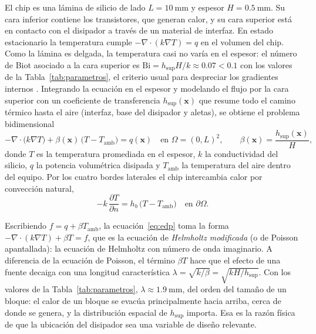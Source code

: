 \documentclass[preprint,11pt,sort&compress]{elsarticle}
\newcommand{\hs}{h_{\mathrm{sup}}}
\newcommand{\Tamb}{T_{\mathrm{amb}}}
\renewcommand{\vec}[1]{\bm{#1}}
\begin{document}
El chip es una lámina de silicio de lado $L=\SI{10}{\milli\metre}$ y espesor
$H=\SI{0.5}{\milli\metre}$. Su cara inferior contiene los transistores, que generan
calor, y su cara superior está en contacto con el disipador a través de un material de
interfaz. En estado estacionario la temperatura cumple
$-\nabla\cdot(k\nabla T)=q$ en el volumen del chip. Como la lámina es delgada, la
temperatura casi no varía en el espesor: el número de Biot asociado a la cara superior es
$\mathrm{Bi}=\hs H/k\approx\num{0.07}<\num{0.1}$ con los valores de la
Tabla~\ref{tab:parametros}, el criterio usual para despreciar los gradientes internos
\cite{incropera2007}. Integrando la ecuación en el espesor y modelando el flujo por la cara
superior con un coeficiente de transferencia $\hs(\vec x)$ que resume todo el camino
térmico hasta el aire (interfaz, base del disipador y aletas), se obtiene el problema
bidimensional
\begin{equation}
  -\nabla\cdot\bigl(k\nabla T\bigr) + \beta(\vec x)\,\bigl(T-\Tamb\bigr) = q(\vec x)
  \quad\text{en }\Omega=(0,L)^2,
  \qquad \beta(\vec x)=\frac{\hs(\vec x)}{H},
  \label{eq:edp}
\end{equation}
donde $T$ es la temperatura promediada en el espesor, $k$ la conductividad del silicio,
$q$ la potencia volumétrica disipada y $\Tamb$ la temperatura del aire dentro del equipo.
Por los cuatro bordes laterales el chip intercambia calor por convección natural,
\begin{equation}
  -k\,\frac{\partial T}{\partial n} = h_b\,\bigl(T-\Tamb\bigr)\quad\text{en }\partial\Omega .
  \label{eq:robin}
\end{equation}

Escribiendo $f=q+\beta\Tamb$, la ecuación~\eqref{eq:edp} toma la forma
$-\nabla\cdot(k\nabla T)+\beta T=f$, que es la ecuación de \emph{Helmholtz modificada}
(o de Poisson apantallada): la ecuación de Helmholtz con número de onda imaginario. A
diferencia de la ecuación de Poisson, el término $\beta T$ hace que el efecto de una fuente
decaiga con una longitud característica $\lambda=\sqrt{k/\beta}=\sqrt{kH/\hs}$. Con los
valores de la Tabla~\ref{tab:parametros}, $\lambda\approx\SI{1.9}{\milli\metre}$, del orden
del tamaño de un bloque: el calor de un bloque se evacúa principalmente hacia arriba, cerca
de donde se genera, y la distribución espacial de $\hs$ importa. Esa es la razón física de
que la ubicación del disipador sea una variable de diseño relevante.
\end{document}
